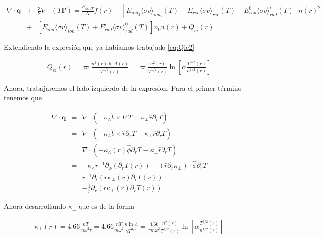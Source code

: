 \begin{eqnarray}
  \nabla\cdot\textbf{q} &+& \frac{3}{2}\nabla\cdot(T\pmb{\Gamma}) = \frac{P_{ext,T}}{N}f(r) -  [E_{ion_2}\langle\sigma v\rangle_{ion_2}(T) + E_{rec}\langle \sigma v\rangle_{rec}(T) + E_{rad}^0\langle\sigma v\rangle_{rad}^i(T)]n(r)^2 \nonumber \\ &+& [E_{ion}\langle\sigma v\rangle_{ion}(T)+ E_{rad}^i\langle\sigma v\rangle_{rad}^0(T)]n_0n(r) + Q_{ei}(r)
\end{eqnarray}

Extendiendo la expresi\'on que ya habiamos trabajado \eqref{eq:Qie2}

\begin{eqnarray*}
  Q_{ei}(r) = \varpi \frac{n^2(r)\ln{\Lambda}(r)}{T^{1/2}(r)} = \varpi\frac{n^2(r)}{T^{1/2}(r)}\ln\left[\alpha \frac{T^{3/2}(r)}{n^{1/2}(r)}\right]
\end{eqnarray*}

Ahora, trabajaremos el lado izquierdo de la expresi\'on. Para el primer t\'ermino tenemos que

\begin{eqnarray}
  \nabla\cdot\textbf{q} &=& \nabla\cdot(-\kappa_\wedge\hat{b}\times\nabla T - \kappa_\perp\hat{r}\partial_r T) \nonumber\\
                        &=& \nabla\cdot(-\kappa_\wedge\hat{b}\times\hat{r}\partial_r T - \kappa_\perp\hat{r}\partial_r T) \nonumber \\
                        &=& \nabla\cdot(-\kappa_\wedge(r)\hat{\phi}\partial_r T - \kappa_\perp\hat{r}\partial_r T) \nonumber\\
                        &=& -\kappa_\wedge r^{-1} \partial_\phi (\partial_r T(r)) - (\hat{r} \partial_r \kappa_\perp)\cdot \hat{\phi}\partial_r T \nonumber\\ 
                        &-& r^{-1}\partial_r(r \kappa_\perp (r) \partial_r T(r)) \nonumber\\
                        &=& - \frac{1}{r}\partial_r(r \kappa_\perp (r) \partial_r T(r))
\end{eqnarray}

Ahora desarrollando $\kappa_\perp$ que es de la forma \cite{helander2005}

\begin{eqnarray} 
  \kappa_\perp(r) = 4.66\frac{nT}{m\omega^2\tau} = 4.66\frac{nT}{m\omega^2}\frac{n\ln\Lambda}{\gamma T^{3/2}} = \frac{4.66}{\gamma m\omega^2}\frac{n^2(r)}{T^{1/2}(r)}\ln\left[\alpha \frac{T^{3/2}(r)}{n^{1/2}(r)}\right]
\end{eqnarray}

